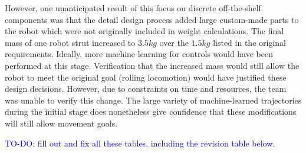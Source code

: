 \documentclass[12pt]{report}
\begin{document}
\begin{table}[ht]
\caption{Off-the-Shelf Engineering Components in Preliminary Design}%
\label{tab:major_components}%
\begin{center}%
\end{center}
\end{table}

However, one unanticipated result of this focus on discrete off-the-shelf components was that the detail design process added large custom-made parts to the robot which were not originally included in weight calculations.
The final mass of one robot strut increased to $3.5 kg$ over the $1.5 kg$ listed in the original requirements.
Ideally, more machine learning for controls would have been performed at this stage.
Verification that the increased mass would still allow the robot to meet the original goal (rolling locomotion) would have justified these design decisions.
However, due to constraints on time and resources, the team was unable to verify this change.
The large variety of machine-learned trajectories during the initial stage does nonetheless give confidence that these modifications will still allow movement goals.

\textcolor{blue}{TO-DO: fill out and fix all these tables, including the revision table below.}

\end{document}
